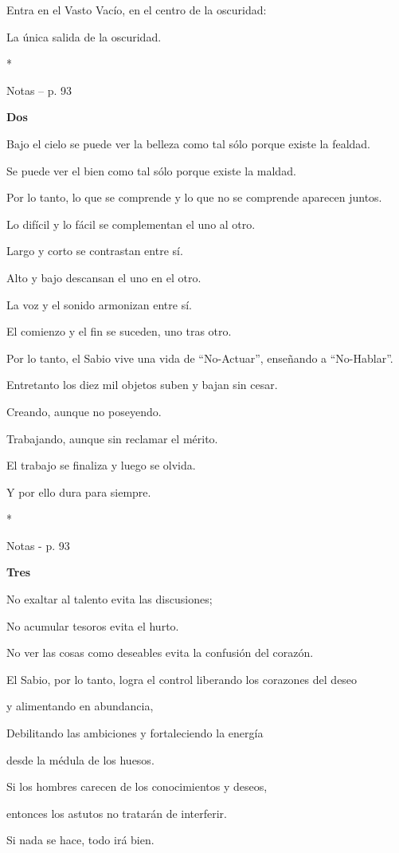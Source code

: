 Entra en el Vasto Vacío, en el centro de la oscuridad:

La única salida de la oscuridad.

*

Notas -- p. 93

\textbf{Dos}

Bajo el cielo se puede ver la belleza como tal sólo porque existe la
fealdad.

Se puede ver el bien como tal sólo porque existe la maldad.

Por lo tanto, lo que se comprende y lo que no se comprende aparecen
juntos.

Lo difícil y lo fácil se complementan el uno al otro.

Largo y corto se contrastan entre sí.

Alto y bajo descansan el uno en el otro.

La voz y el sonido armonizan entre sí.

El comienzo y el fin se suceden, uno tras otro.

Por lo tanto, el Sabio vive una vida de ``No-Actuar'', enseñando a
``No-Hablar''.

Entretanto los diez mil objetos suben y bajan sin cesar.

Creando, aunque no poseyendo.

Trabajando, aunque sin reclamar el mérito.

El trabajo se finaliza y luego se olvida.

Y por ello dura para siempre.

*

Notas - p. 93

\textbf{Tres}

No exaltar al talento evita las discusiones;

No acumular tesoros evita el hurto.

No ver las cosas como deseables evita la confusión del corazón.

El Sabio, por lo tanto, logra el control liberando los corazones del
deseo

y alimentando en abundancia,

Debilitando las ambiciones y fortaleciendo la energía

desde la médula de los huesos.

Si los hombres carecen de los conocimientos y deseos,

entonces los astutos no tratarán de interferir.

Si nada se hace, todo irá bien.

